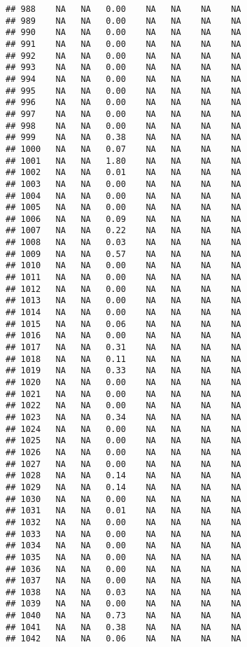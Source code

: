 \documentclass{article}\usepackage{graphicx, color}
\makeatletter
\newenvironment{kframe}{%
 \def\at@end@of@kframe{}%
 \ifinner\ifhmode%
  \def\at@end@of@kframe{\end{minipage}}%
  \begin{minipage}{\columnwidth}%
 \fi\fi%
 \def\FrameCommand##1{\hskip\@totalleftmargin \hskip-\fboxsep
 \colorbox{shadecolor}{##1}\hskip-\fboxsep
     \hskip-\linewidth \hskip-\@totalleftmargin \hskip\columnwidth}%
 \MakeFramed {\advance\hsize-\width
   \@totalleftmargin\z@ \linewidth\hsize
   \@setminipage}}%
 {\par\unskip\endMakeFramed%
 \at@end@of@kframe}
\newenvironment{knitrout}{}{} %
\makeatother
\begin{document}
\begin{knitrout}
\begin{kframe}
\begin{verbatim}
## 988    NA   NA   0.00    NA   NA    NA    NA
## 989    NA   NA   0.00    NA   NA    NA    NA
## 990    NA   NA   0.00    NA   NA    NA    NA
## 991    NA   NA   0.00    NA   NA    NA    NA
## 992    NA   NA   0.00    NA   NA    NA    NA
## 993    NA   NA   0.00    NA   NA    NA    NA
## 994    NA   NA   0.00    NA   NA    NA    NA
## 995    NA   NA   0.00    NA   NA    NA    NA
## 996    NA   NA   0.00    NA   NA    NA    NA
## 997    NA   NA   0.00    NA   NA    NA    NA
## 998    NA   NA   0.00    NA   NA    NA    NA
## 999    NA   NA   0.38    NA   NA    NA    NA
## 1000   NA   NA   0.07    NA   NA    NA    NA
## 1001   NA   NA   1.80    NA   NA    NA    NA
## 1002   NA   NA   0.01    NA   NA    NA    NA
## 1003   NA   NA   0.00    NA   NA    NA    NA
## 1004   NA   NA   0.00    NA   NA    NA    NA
## 1005   NA   NA   0.00    NA   NA    NA    NA
## 1006   NA   NA   0.09    NA   NA    NA    NA
## 1007   NA   NA   0.22    NA   NA    NA    NA
## 1008   NA   NA   0.03    NA   NA    NA    NA
## 1009   NA   NA   0.57    NA   NA    NA    NA
## 1010   NA   NA   0.00    NA   NA    NA    NA
## 1011   NA   NA   0.00    NA   NA    NA    NA
## 1012   NA   NA   0.00    NA   NA    NA    NA
## 1013   NA   NA   0.00    NA   NA    NA    NA
## 1014   NA   NA   0.00    NA   NA    NA    NA
## 1015   NA   NA   0.06    NA   NA    NA    NA
## 1016   NA   NA   0.00    NA   NA    NA    NA
## 1017   NA   NA   0.31    NA   NA    NA    NA
## 1018   NA   NA   0.11    NA   NA    NA    NA
## 1019   NA   NA   0.33    NA   NA    NA    NA
## 1020   NA   NA   0.00    NA   NA    NA    NA
## 1021   NA   NA   0.00    NA   NA    NA    NA
## 1022   NA   NA   0.00    NA   NA    NA    NA
## 1023   NA   NA   0.34    NA   NA    NA    NA
## 1024   NA   NA   0.00    NA   NA    NA    NA
## 1025   NA   NA   0.00    NA   NA    NA    NA
## 1026   NA   NA   0.00    NA   NA    NA    NA
## 1027   NA   NA   0.00    NA   NA    NA    NA
## 1028   NA   NA   0.14    NA   NA    NA    NA
## 1029   NA   NA   0.14    NA   NA    NA    NA
## 1030   NA   NA   0.00    NA   NA    NA    NA
## 1031   NA   NA   0.01    NA   NA    NA    NA
## 1032   NA   NA   0.00    NA   NA    NA    NA
## 1033   NA   NA   0.00    NA   NA    NA    NA
## 1034   NA   NA   0.00    NA   NA    NA    NA
## 1035   NA   NA   0.00    NA   NA    NA    NA
## 1036   NA   NA   0.00    NA   NA    NA    NA
## 1037   NA   NA   0.00    NA   NA    NA    NA
## 1038   NA   NA   0.03    NA   NA    NA    NA
## 1039   NA   NA   0.00    NA   NA    NA    NA
## 1040   NA   NA   0.73    NA   NA    NA    NA
## 1041   NA   NA   0.38    NA   NA    NA    NA
## 1042   NA   NA   0.06    NA   NA    NA    NA

\end{verbatim}
\end{kframe}
\end{knitrout}
\end{document}
